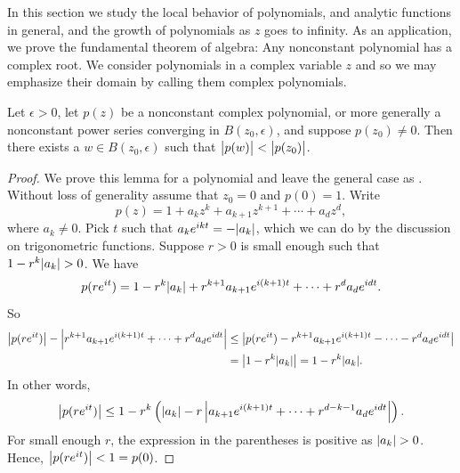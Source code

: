 
In this section we study the local behavior of polynomials,
and analytic functions in general,
and the growth of polynomials as $z$ goes to infinity.
As an application, we prove the fundamental theorem of algebra:
Any nonconstant polynomial has a complex root.
We consider polynomials in a complex variable $z$
and so we may emphasize their domain by calling them complex polynomials.

\begin{lemma} \label{lemma:polyalwaysgetssmaller}
Let $\epsilon > 0$,
let $p(z)$ be a nonconstant complex polynomial, or more generally
a nonconstant power series converging in $B(z_0,\epsilon)$,
and suppose $p(z_0) \neq 0$.
Then there exists a $w \in B(z_0,\epsilon)$ such that $\bigl\lvert {p(w)} \bigr\rvert < \bigl\lvert {p(z_0)} \bigr\rvert$.
\end{lemma}

\begin{proof}
We prove this lemma for a polynomial and leave the general case as
.
Without loss of generality assume that $z_0 = 0$ and $p(0) = 1$.  Write
\begin{equation*}
p(z) = 1+a_kz^k + a_{k+1}z^{k+1} + \cdots + a_d z^d ,
\end{equation*}
where $a_k \neq 0$.  Pick $t$ such that $a_k e^{ikt} = -\lvert {a_k} \rvert$, which
we can do by the discussion on trigonometric functions.  Suppose
$r > 0$ is small enough such that
$1-r^k \lvert {a_k} \rvert > 0$.  We have
\begin{equation*}
p(r e^{it}) =
1-r^k \lvert {a_k} \rvert + r^{k+1}a_{k+1}e^{i(k+1)t} + \cdots + r^{d}a_{d}e^{idt} .
\end{equation*}
So
\begin{equation*}
\begin{split}
\bigl\lvert {
p(r e^{it}) } \bigr\rvert - \left\lvert {
r^{k+1}a_{k+1}e^{i(k+1)t} + \cdots + r^{d}a_{d}e^{idt}
} \right\rvert
&
\leq
\bigl\lvert {
p(r e^{it}) 
- r^{k+1}a_{k+1}e^{i(k+1)t} - \cdots - r^{d}a_{d}e^{idt}
} \bigr\rvert
\\
&
=
\bigl\lvert {
1-r^k \lvert {a_k} \rvert
} \bigr\rvert
=
1-r^k \lvert {a_k} \rvert .
\end{split}
\end{equation*}
In other words,
\begin{equation*}
\bigl\lvert {
p(r e^{it}) } \bigr\rvert
\leq
1-r^k \left( \lvert {a_k} \rvert
-
r
\left\lvert {
a_{k+1}e^{i(k+1)t} + \cdots + r^{d-k-1}a_{d}e^{idt}
} \right\rvert
\right) .
\end{equation*}
For small enough $r$, the expression in the parentheses is positive
as $\lvert {a_k} \rvert > 0$.  Hence, $\bigl\lvert {p(re^{it})} \bigr\rvert < 1 = p(0)$.
\end{proof}

